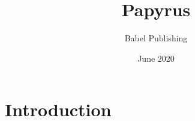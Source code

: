 \documentclass{article}
\title{Papyrus}
\author{Babel Publishing}
\date{June 2020}
\begin{document}
\maketitle

\section{Introduction}
\end{document}
